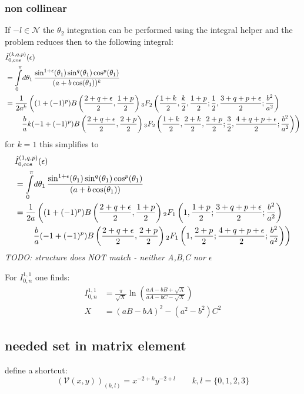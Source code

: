 \subsubsection{non collinear}
If $-l\in\mathcal N$ the $\theta_2$ integration can be performed using the integral helper and the problem reduces then to the following integral:
\begin{align}
&\hat I_{0,\cos}^{(k,q,p)}(\epsilon) \nonumber\\
&= \int\limits_0^\pi\!d\theta_1\, \frac{\sin^{1+\epsilon}(\theta_1)\sin^q(\theta_1) \cos^p(\theta_1)}{(a+b\cos(\theta_1))^k}\\
&= \frac 1 {2a^k}\left((1+(-1)^p)B\left(\frac{2+q+\epsilon}{2},\frac{1+p}{2}\right){}_{3}F_{2} \left(\frac{1+k}{2},\frac k 2,\frac{1+p}{2};\frac{1}{2},\frac{3+q+p+\epsilon}{2};\frac{b^2}{a^2}\right)\right.\nonumber\\
 &\hspace{20pt}\left. \frac b a k(-1+(-1)^p)B\left(\frac{2+q+\epsilon}{2},\frac{2+p}{2}\right){}_{3}F_{2}\left(\frac{1+k} 2,\frac{2+k}{2},\frac{2+p}{2};\frac{3}{2},\frac{4+q+p+\epsilon}{2};\frac{b^2}{a^2}\right) \right)
\end{align}
for $k=1$ this simplifies to
\begin{align}
&\hat I_{0,\cos}^{(1,q,p)}(\epsilon) \nonumber\\
&= \int\limits_0^\pi\!d\theta_1\, \frac{\sin^{1+\epsilon}(\theta_1)\sin^q(\theta_1) \cos^p(\theta_1)}{(a+b\cos(\theta_1))}\\
&= \frac 1 {2a}\left((1+(-1)^p)B\left(\frac{2+q+\epsilon}{2},\frac{1+p}{2}\right){}_{2}F_{1} \left(1,\frac{1+p}{2};\frac{3+q+p+\epsilon}{2};\frac{b^2}{a^2}\right)\right.\nonumber\\
 &\hspace{20pt}\left. \frac b a (-1+(-1)^p)B\left(\frac{2+q+\epsilon}{2},\frac{2+p}{2}\right){}_{2}F_{1}\left(1,\frac{2+p}{2};\frac{4+q+p+\epsilon}{2};\frac{b^2}{a^2}\right) \right)
\end{align}
\textit{TODO: structure does NOT match \cite[Ch. 5]{Bojak:2000eu} - neither A,B,C nor $\epsilon$}  

For $I_{0,n}^{1,1}$ one finds\cite[Ch. 5]{Bojak:2000eu}:
\begin{align}
I_{0,n}^{1,1} &= \frac{\pi}{\sqrt X}\ln\left(\frac{aA - bB + \sqrt X}{aA - bC - \sqrt X}\right)\\
X &= (aB - bA)^2 - (a^2-b^2)C^2
\end{align}

\subsection{needed set in matrix element}
define a shortcut:
\begin{equation}
\left(\mathcal V(x,y)\right)_{(k,l)} = x^{-2+k} y^{-2+l} \qquad k,l = \{0,1,2,3\}
\end{equation}

